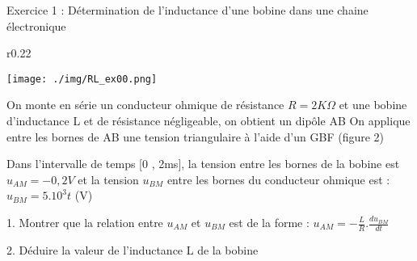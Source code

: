 \documentclass[12pt, french]{article}
\begin{document}
\begin{center}

\vspace{-2cm}
\end{center}

\vspace{-0.5cm}
   \begin{Box2}{Exercice 1 : Détermination de l’inductance d’une bobine dans une chaine électronique }
\begin{wrapfigure}{r}{0.22\textwidth}
  \begin{center}
	  \vspace{-0.6cm}
	\texttt{[image: ./img/RL\_ex00.png]}
  \end{center}
\end{wrapfigure}


On monte en série un conducteur ohmique de résistance $R=2 K \Omega$ et une
bobine d’inductance L et de résistance négligeable, on obtient un dipôle AB On
applique entre les bornes de AB une tension triangulaire à l’aide d’un GBF
(figure 2)

Dans l’intervalle de temps [0 , 2ms], la tension entre les bornes de la bobine
est $u_{AM}=-0,2V$ et la tension $u_{BM}$ entre les bornes du conducteur ohmique est : $u_{BM}=5.10^3 t $ (V)

1. Montrer que la relation entre $u_{AM}$ et $u_{BM}$ est de la forme :
$u_{AM} = -\frac{L}{R}.\frac{du_{BM}}{dt}$

2. Déduire la valeur de l’inductance L de la bobine

   \end{Box2}
\end{document}
